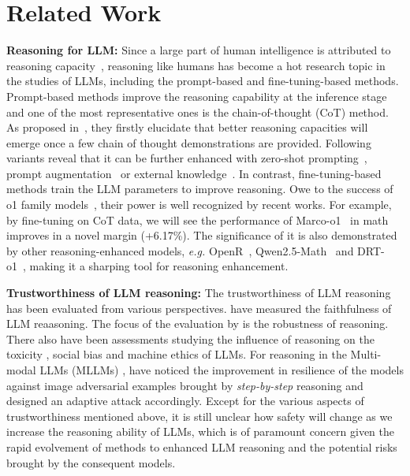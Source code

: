\section{Related Work}
\label{sec::related_work}
\textbf{Reasoning for LLM: } Since a large part of human intelligence is attributed to reasoning capacity~\citep{lohman2011intelligence}, reasoning like humans has become a hot research topic in the studies of LLMs, including the prompt-based and fine-tuning-based methods. Prompt-based methods improve the reasoning capability at the inference stage and one of the most representative ones is the chain-of-thought (CoT) method. As proposed in~\citet{wei2022chain}, they firstly elucidate that better reasoning capacities will emerge once a few chain of thought demonstrations are provided. Following variants reveal that it can be further enhanced with zero-shot prompting~\citep{kojima2022large,zhang2022automatic}, prompt augmentation~\citep{shum2023automatic} or external knowledge~\citep{liu2023retrieval,zhao2023verify}. In contrast, fine-tuning-based methods train the LLM parameters to improve reasoning. Owe to the success of o1 family models~\citep{jaech2024openai}, their power is well recognized by recent works. For example, by fine-tuning on CoT data, we will see the performance of Marco-o1~\citep{zhao2024marco} in math improves in a novel margin (+6.17\%). The significance of it is also demonstrated by other reasoning-enhanced models, \textit{e.g.} OpenR~\citep{wang2024openr}, Qwen2.5-Math~\citep{yang2024qwen25mathtechnicalreportmathematical} and DRT-o1~\citep{wang2024drt}, making it a sharping tool for reasoning enhancement.

\noindent\textbf{Trustworthiness of LLM reasoning: }The trustworthiness of LLM reasoning has been evaluated from various perspectives. \citet{Radhakrishnan2023QuestionDI, li-etal-2024-deceptive, paul-etal-2024-making, Chua2024BiasAugmentedCT} have measured the faithfulness of LLM reaasoning. The focus of the evaluation by \citet{Radhakrishnan2023QuestionDI, han-etal-2024-context, steenhoek2025errmachinevulnerabilitydetection, Self-correct-reasoning} is the robustness of reasoning. There also have been assessments studying the influence of reasoning on the toxicity \citep{not-think}, social bias \citep{not-think, Persona-Reasoning} and machine ethics \citep{Ethics-Reasoning} of LLMs. For reasoning in the Multi-modal LLMs (MLLMs) \citep{lu2022learn, 10.1609/aaai.v38i16.29776}, \citet{multimodel-reasoning} have noticed the improvement in resilience of the models against image adversarial examples brought by \textit{step-by-step} reasoning and designed an adaptive attack accordingly. Except for the various aspects of trustworthiness mentioned above, it is still unclear how safety will change as we increase the reasoning ability of LLMs, which is of paramount concern given the rapid evolvement of methods to enhanced LLM reasoning and the potential risks brought by the consequent models.